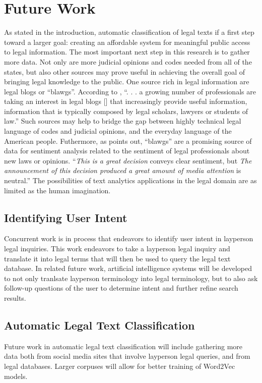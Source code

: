 \documentclass[11pt]{article}
\begin{document}
\section{Future Work}
As stated in the introduction, automatic classification of legal texts if a first step toward a larger goal: creating an affordable system for meaningful public access to legal information.  The most important next step in this research is to gather more data.  Not only are more judicial opinions and codes needed from all of the states, but also other sources may prove useful in achieving the overall goal of bringing legal knowledge to the public.  One source rich in legal information are legal blogs or ``blawgs''.  According to \cite[p.~167]{conrad2009query}, ``. . . a growing number of professionals are taking an interest in legal blogs [] that increasingly provide useful information, information that is typically composed by legal scholars, lawyers or students of law.''  Such sources may help to bridge the gap between highly technical legal language of codes and judicial opinions, and the everyday language of the American people.  Futhermore, as \cite[p.~231]{conrad2007opinion} points out, ``blawgs'' are a promising source of data for sentiment analysis related to the sentiment of legal professionals about new laws or opinions.  ``\textit{This is a great decision} conveys clear sentiment, but \textit{The announcement of this decision produced a great amount of media attention} is neutral.''  The possibilities of text analytics applications in the legal domain are as limited as the human imagination.

\subsection{Identifying User Intent}
Concurrent work is in process that endeavors to identify user intent in layperson legal inquiries.  This work endeavors to take a layperson legal inquiry and translate it into legal terms that will then be used to query the legal text database.  In related future work, artificial intelligence systems will be developed to not only tranlsate layperson terminology into legal terminology, but to also ask follow-up questions of the user to determine intent and further refine search results.  

\subsection{Automatic Legal Text Classification}
Future work in automatic legal text classification will include gathering more data both from social media sites that involve layperson legal queries, and from legal databases.  Larger corpuses will allow for better training of Word2Vec models.
\end{document}
